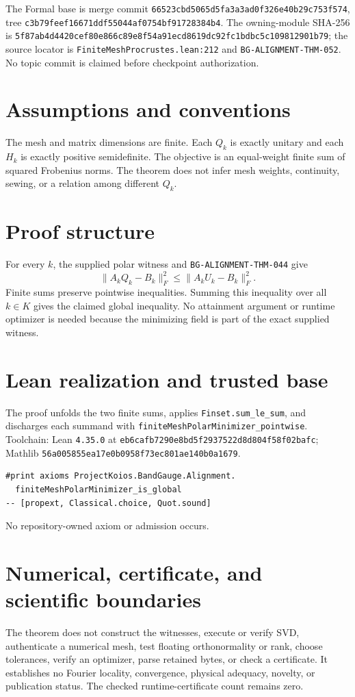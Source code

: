 \documentclass[10pt]{article}
\begin{document}
The Formal base is merge commit \texttt{66523cbd5065d5fa3a3ad0f326e40b29c753f574}, tree
\texttt{c3b79feef16671ddf55044af0754bf91728384b4}. The owning-module SHA-256 is
\texttt{5f87ab4d4420cef80e866c89e8f54a91ecd8619dc92fc1bdbc5c109812901b79}; the source locator is
\texttt{FiniteMeshProcrustes.lean:212} and \texttt{BG-ALIGNMENT-THM-052}. No topic commit is
claimed before checkpoint authorization.

\section{Assumptions and conventions}
The mesh and matrix dimensions are finite. Each $Q_k$ is exactly unitary and each $H_k$ is exactly
positive semidefinite. The objective is an equal-weight finite sum of squared Frobenius norms. The
theorem does not infer mesh weights, continuity, sewing, or a relation among different $Q_k$.

\section{Proof structure}
For every $k$, the supplied polar witness and \texttt{BG-ALIGNMENT-THM-044} give
\[
  \lVert A_kQ_k-B_k\rVert_F^2
  \le \lVert A_kU_k-B_k\rVert_F^2.
\]
Finite sums preserve pointwise inequalities. Summing this inequality over all $k\in K$ gives the
claimed global inequality. No attainment argument or runtime optimizer is needed because the
minimizing field is part of the exact supplied witness.

\section{Lean realization and trusted base}
The proof unfolds the two finite sums, applies \texttt{Finset.sum\_le\_sum}, and discharges each
summand with \texttt{finiteMeshPolarMinimizer\_pointwise}. Toolchain: Lean \texttt{4.35.0} at
\texttt{eb6cafb7290e8bd5f2937522d8d804f58f02bafc}; Mathlib
\texttt{56a005855ea17e0b0958f73ec801ae140b0a1679}.
\begin{verbatim}
#print axioms ProjectKoios.BandGauge.Alignment.
  finiteMeshPolarMinimizer_is_global
-- [propext, Classical.choice, Quot.sound]
\end{verbatim}
No repository-owned axiom or admission occurs.

\section{Numerical, certificate, and scientific boundaries}
The theorem does not construct the witnesses, execute or verify SVD, authenticate a numerical
mesh, test floating orthonormality or rank, choose tolerances, verify an optimizer, parse retained
bytes, or check a certificate. It establishes no Fourier locality, convergence, physical adequacy,
novelty, or publication status. The checked runtime-certificate count remains zero.
\end{document}
